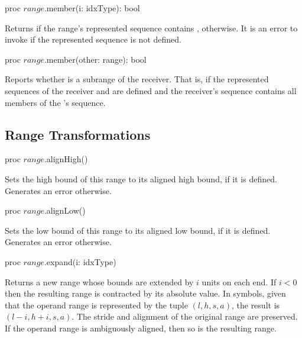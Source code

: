 \begin{protohead}
proc $range$.member(i: idxType): bool
\end{protohead}
\begin{protobody}
Returns  if the range's represented sequence
contains ,  otherwise.
It is an error to invoke  if the represented sequence
is not defined.
\end{protobody}

\begin{protohead}
proc $range$.member(other: range): bool
\end{protohead}
\begin{protobody}
Reports whether  is a subrange of the receiver. That is,
if the represented sequences of the receiver and 
are defined and the receiver's sequence contains all members of the
's sequence.
\end{protobody}

\subsection{Range Transformations}
\label{Range_Transformations}

\begin{protohead}
proc $range$.alignHigh()
\end{protohead}
\begin{protobody}
Sets the high bound of this range to its aligned high bound, if it is defined.
Generates an error otherwise.
\end{protobody}

\begin{protohead}
proc $range$.alignLow()
\end{protohead}
\begin{protobody}
Sets the low bound of this range to its aligned low bound, if it is defined.
Generates an error otherwise.
\end{protobody}

\begin{protohead}
proc $range$.expand(i: idxType)
\end{protohead}
\begin{protobody}
Returns a new range whose bounds are extended by $i$ units on each end.  If $i <
0$ then the resulting range is contracted by its absolute value.  In symbols,
given that the operand range is represented by the tuple $(l,h,s,a)$, the result
is $(l-i,h+i,s,a)$.  The stride and alignment of the original range are preserved.
If the operand range is ambiguously aligned, then so is the resulting range.
\end{protobody}

